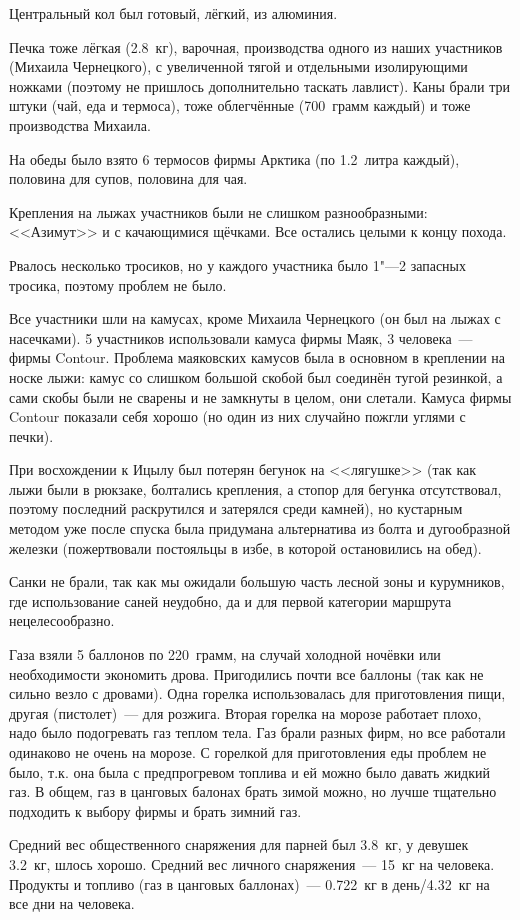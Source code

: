 Центральный кол был готовый, лёгкий, из алюминия.

Печка тоже лёгкая (2.8~кг), варочная, производства одного из наших участников (Михаила Чернецкого), с увеличенной тягой и отдельными изолирующими ножками (поэтому не пришлось дополнительно таскать лавлист). Каны брали три штуки (чай, еда и термоса), тоже облегчённые (700~грамм каждый) и тоже производства Михаила. 

На обеды было взято 6 термосов фирмы Арктика (по 1.2~литра каждый), половина для супов, половина для чая.

Крепления на лыжах участников были не слишком разнообразными: <<Азимут>> и с качающимися щёчками. Все остались целыми к концу похода.

Рвалось несколько тросиков, но у каждого участника было 1"---2 запасных тросика, поэтому проблем не было.

Все участники шли на камусах, кроме Михаила Чернецкого (он был на лыжах с насечками). 5 участников использовали камуса фирмы Маяк, 3 человека~--- фирмы Contour. Проблема маяковских камусов была в основном в креплении на носке лыжи: камус со слишком большой скобой был соединён тугой резинкой, а сами скобы были не сварены и не замкнуты в целом, они слетали. Камуса фирмы Contour показали себя хорошо (но один из них случайно пожгли углями с печки).

При восхождении к Ицылу был потерян бегунок на <<лягушке>> (так как лыжи были в рюкзаке, болтались крепления, а стопор для бегунка отсутствовал, поэтому последний раскрутился и затерялся среди камней), но кустарным методом уже после спуска была придумана альтернатива из болта и дугообразной железки (пожертвовали постояльцы в избе, в которой остановились на обед). 

Санки не брали, так как мы ожидали большую часть лесной зоны и курумников, где использование саней неудобно, да и для первой категории маршрута нецелесообразно.

Газа взяли 5 баллонов по 220~грамм, на случай холодной ночёвки или необходимости экономить дрова. Пригодились почти все баллоны (так как не сильно везло с дровами). Одна горелка использовалась для приготовления пищи, другая (пистолет)~--- для розжига. Вторая горелка на морозе работает плохо, надо было подогревать газ теплом тела. Газ брали разных фирм, но все работали одинаково не очень на морозе.
С горелкой для приготовления еды проблем не было, т.к. она была с предпрогревом топлива и ей можно было давать жидкий газ.
В общем, газ в цанговых балонах брать зимой можно, но лучше тщательно подходить к выбору фирмы и брать зимний газ.

Средний вес общественного снаряжения для парней был 3.8~кг, у девушек 3.2~кг, шлось хорошо.
Средний вес личного снаряжения~--- 15~кг на человека.
Продукты и топливо (газ в цанговых баллонах)~--- 0.722~кг в день/4.32~кг на все дни на человека.

\clearpage